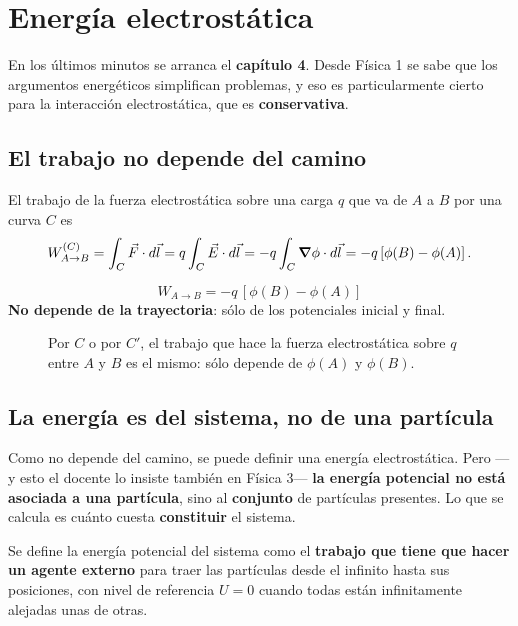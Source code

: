 \documentclass[12pt,a4paper]{article}
\begin{document}
\section{Energía electrostática}

En los últimos minutos se arranca el \textbf{capítulo 4}. Desde Física 1 se sabe
que los argumentos energéticos simplifican problemas, y eso es particularmente
cierto para la interacción electrostática, que es \textbf{conservativa}.

\subsection{El trabajo no depende del camino}

El trabajo de la fuerza electrostática sobre una carga $q$ que va de $A$ a $B$
por una curva $C$ es
\[
W_{A\to B}^{(C)} = \int_C \vec F \cdot d\vec l
= q\int_C \vec E\cdot d\vec l
= -q\int_C \grad\phi\cdot d\vec l
= -q\left[\phi(B)-\phi(A)\right].
\]

\begin{keybox}
\[
\boxed{\ W_{A\to B} = -q\,\left[\phi(B) - \phi(A)\right]\ }
\]
\textbf{No depende de la trayectoria}: sólo de los potenciales inicial y final.
\end{keybox}

\begin{figure}[H]
  \centering
  
  \caption{Por $C$ o por $C'$, el trabajo que hace la fuerza electrostática sobre
  $q$ entre $A$ y $B$ es el mismo: sólo depende de $\phi(A)$ y $\phi(B)$.}
\end{figure}

\subsection{La energía es del sistema, no de una partícula}

Como no depende del camino, se puede definir una energía electrostática. Pero
---y esto el docente lo insiste también en Física 3--- \textbf{la energía
potencial no está asociada a una partícula}, sino al \textbf{conjunto} de
partículas presentes. Lo que se calcula es cuánto cuesta \textbf{constituir} el
sistema.

Se define la energía potencial del sistema como el \textbf{trabajo que tiene que
hacer un agente externo} para traer las partículas desde el infinito hasta sus
posiciones, con nivel de referencia $U = 0$ cuando todas están infinitamente
alejadas unas de otras.
\end{document}
